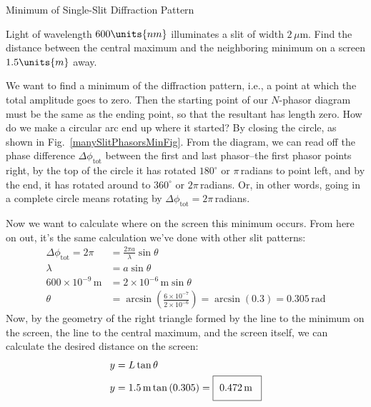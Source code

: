 \begin{example}{Minimum of Single-Slit Diffraction Pattern}
\label{exampleSingleSlit}



Light of wavelength $600\units{nm}$ illuminates a slit of
width $2\,\mu$m. Find the distance between the central maximum and the
neighboring minimum on a screen $1.5\units{m}$ away.

\begin{solution}
We want to find a minimum of the diffraction
pattern, i.e., a point at which the total amplitude goes to zero.
Then the starting point of our $N$-phasor diagram must be the same as
the ending point, so that the resultant has length zero.  How do we
make a circular arc end up where it started?  By closing the circle,
as shown in Fig.~\ref{manySlitPhasorsMinFig}.  From the diagram, we can read off the phase
difference $\Delta\phi_\text{tot}$ between the first and last
phasor--the first phasor points right, by the top of the circle it has
rotated $180^\circ$ or $\pi$\,radians to point left, and by the end,
it has rotated around to $360^\circ$ or $2\pi$\,radians.  Or, in other words,
 going in
a complete circle means rotating by
$\Delta\phi_\text{tot}=2\pi$\,radians.

Now we want to calculate where on the screen  this minimum occurs.
 From here on out, it's
the same calculation we've done with other slit patterns:
\begin{align*} 
\Delta\phi_\text{tot}=2\pi&=\frac{2\pi
a}{\lambda}\sin\theta\\ 
\lambda &= a\sin\theta\\
600\times 10^{-9}\,\text{m} &= 2\times 10^{-6}\,\text{m} \sin\theta\\
\theta&=\arcsin \left(
\frac{6\times 10^{-7}}{2\times 10^{-6}} \right)
=  \arcsin \left(0.3\right) = 0.305\,\text{rad}
\end{align*}
Now, by the geometry of the right triangle formed by the line
to the minimum on the screen, the line to the central maximum, and the screen itself, we can calculate the desired distance on the screen:
\begin{align*}
y &= L \tan\theta \\ 
y&=1.5\,\text{m} \tan\left( 0.305 
\right)= \fbox{\,\,0.472\,m\phantom{\Big (}}
\end{align*}
\end{solution}
\end{example}

